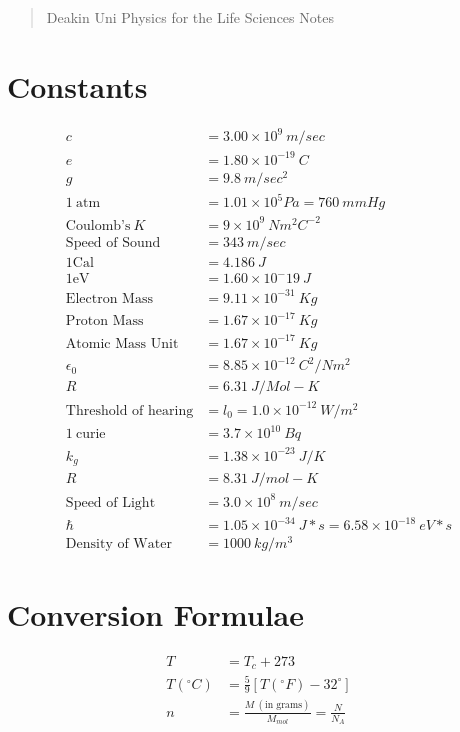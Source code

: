 \documentclass[]{article}
\title{}
\author{Peter Harding}
\begin{document}
\maketitle

\begin{abstract}
Deakin Uni Physics for the Life Sciences Notes
\end{abstract}

\section{Constants}

\begin{align*}
	c &= 3.00 \times 10^9 \  m/sec \\
	e &= 1.80 \times 10^{-19} \  C \\
	g &= 9.8 \  m/sec^2 \\
	1 \  \text{atm} &= 1.01 \times 10^5 Pa = 760 \  mm Hg \\
	\text{Coulomb's} \   K &= 9 \times 10^9 \  Nm^2 C^{-2} \\
	\text{Speed of Sound} &= 343 \  m/sec \\
	1 \text{Cal} &= 4.186 \  J \\
	1 \text{eV} &= 1.60 \times 10^-19 \  J \\
	\text{Electron Mass} &= 9.11 \times 10^{-31} \  Kg \\
	\text{Proton Mass} &= 1.67 \times 10^{-17} \  Kg \\
	\text{Atomic Mass Unit} &=  1.67 \times 10^{-17} \  Kg \\
	\epsilon_0 &= 8.85 \times 10^{-12} \  C^2/Nm^2 \\
	R &= 6.31 \  J/Mol-K \\ 
	\text{Threshold of hearing} &= l_0 = 1.0 \times 10^{-12} \  W/m^2 \\
    1 \  \text{curie} &= 3.7 \times 10^{10} \  Bq \\
    k_g &= 1.38 \times 10^{-23} \  J/K \\
    R &= 8.31 \  J/mol-K \\
    \text{Speed of Light} &= 3.0 \times 10^{8} \  m/sec \\
    \hbar &= 1.05 \times 10^{-34} \  J * s = 6.58 \times 10^{-18} \  eV*s \\
    \text{Density of Water} &= 1000 \  kg/m^3
\end{align*}

\section{Conversion Formulae}
\begin{align*}
	T &= T_c + 273 \\
	T(^\circ C) &= \frac{5}{9}[T(^\circ F) - 32 ^\circ] \\
	n &= \frac{M \  (\text{in grams})}{M_{mol}} = \frac{N}{N_A}
\end{align*}
\end{document}
